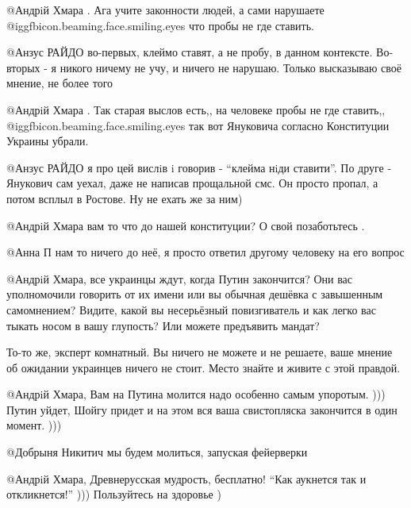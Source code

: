 \begin{itemize}
\begin{itemize}

@Андрiй Хмара . Ага учите законности людей, а сами нарушаете  @igg{fbicon.beaming.face.smiling.eyes}  что пробы не
где ставить.


@Анзус РАЙДО  во-первых, клеймо ставят, а не пробу, в данном контексте.
Во-вторых - я никого ничему не учу, и ничего не нарушаю. Только высказываю
своё мнение, не более того


@Андрiй Хмара . Так старая выслов есть,, на человеке пробы не где ставить,,  @igg{fbicon.beaming.face.smiling.eyes} 
так вот Януковича согласно Конституции Украины убрали.


@Анзус РАЙДО  я про цей вислiв i говорив - \enquote{клейма нiди ставити}. По друге -
Янукович сам уехал, даже не написав прощальной смс. Он просто пропал, а потом
всплыл в Ростове. Ну не ехать же за ним)


@Андрiй Хмара  вам то  что до нашей конституции? О свой позаботьтесь .



@Анна П  нам то ничего до неё, я просто ответил другому человеку на его вопрос


@Андрiй Хмара, все украинцы ждут, когда Путин закончится? Они вас
уполномочили говорить от их имени или вы обычная дешёвка с завышенным
самомнением? Видите, какой вы несерьёзный повизгиватель и как легко вас тыкать
носом в вашу глупость? Или можете предъявить мандат? 

То-то же, эксперт комнатный. Вы ничего не можете и не решаете, ваше мнение об
ожидании украинцев ничего не стоит. Место знайте и живите с этой правдой.


@Андрiй Хмара, Вам на Путина молится надо особенно самым упоротым. ))) Путин
уйдет, Шойгу придет и на этом вся ваша свистопляска закончится в один момент.
)))


@Добрыня Никитич  мы будем молиться, запуская фейерверки


@Андрiй Хмара, Древнерусская мудрость, бесплатно! \enquote{Как аукнется так и
откликнется!} ))) Пользуйтесь на здоровье )


\end{itemize}
\end{itemize}
